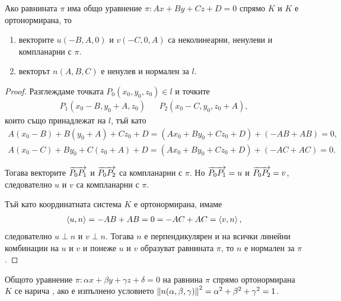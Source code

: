 \documentclass[numbers=endperiod, bibliography=totocnumbered]{scrartcl}
\begin{document}
\begin{proposition}
  Ако равнината \( \pi \) има общо уравнение \( \pi: Ax + By + Cz + D = 0 \) спрямо \( K \) и \( K \) е ортонормирана, то
  \begin{enumerate}
    \item векторите \( u(-B, A, 0) \) и \( v(-C, 0, A) \) са неколинеарни, ненулеви и компланарни с \( \pi \).
    \item векторът \( n(A, B, C) \) е ненулев и нормален за \( l \).
  \end{enumerate}
\end{proposition}
\begin{proof}
  \item Разглеждаме точката \( P_0(x_0, y_0, z_0) \in l \) и точките
  \begin{align*}
    P_1(x_0 - B, y_0 + A, z_0)
    &&
    P_2(x_0 - C, y_0, z_0 + A),
  \end{align*}
  които също принадлежат на \( l \), тъй като
  \begin{align*}
    A(x_0 - B) + B(y_0 + A) + Cz_0 + D = (Ax_0 + By_0 + Cz_0 + D) + (-AB + AB) = 0, \\
    A(x_0 - C) + By_0 + C(z_0 + A) + D = (Ax_0 + By_0 + Cz_0 + D) + (-AC + AC) = 0.
  \end{align*}

  Тогава векторите \( \overrightarrow{P_0 P_1} \) и \( \overrightarrow{P_0 P_2} \) са компланарни с \( \pi \). Но \( \overrightarrow{P_0 P_1} = u \) и \( \overrightarrow{P_0 P_2} = v \), следователно \( u \) и \( v \) са компланарни с \( \pi \).

  \item Тъй като координатната система \( K \) е ортонормирана, имаме
  \begin{align*}
    \left\langle u, n \right\rangle = -AB + AB = 0 = -AC + AC = \left\langle v, n \right\rangle,
  \end{align*}
  следователно \( u \perp n \) и \( v \perp n \). Тогава \( n \) е перпендикулярен и на всички линейни комбинации на \( u \) и \( v \) и понеже \( u \) и \( v \) образуват равнината \( \pi \), то \( n \) е нормален за \( \pi \).
\end{proof}

\begin{definition}
  Общото уравнение \( \pi: \alpha x + \beta y + \gamma z + \delta = 0 \) на равнина \( \pi \) спрямо ортонормирана \( K \) се нарича , ако е изпълнено условието \( \left\Vert n(\alpha, \beta, \gamma) \right\Vert^2 = \alpha^2 + \beta^2 + \gamma^2 = 1 \).
\end{definition}
\end{document}
